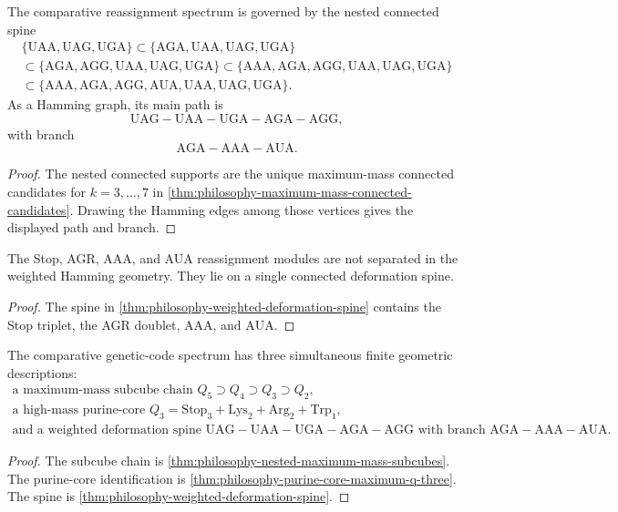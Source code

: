 \begin{theorem}
\label{thm:philosophy-weighted-deformation-spine}
The comparative reassignment spectrum is governed by the nested
connected spine
$$
\begin{gathered}
  \{\mathrm{UAA},\mathrm{UAG},\mathrm{UGA}\}
  \subset
  \{\mathrm{AGA},\mathrm{UAA},\mathrm{UAG},\mathrm{UGA}\}\\
  \subset
  \{\mathrm{AGA},\mathrm{AGG},\mathrm{UAA},\mathrm{UAG},\mathrm{UGA}\}
  \subset
  \{\mathrm{AAA},\mathrm{AGA},\mathrm{AGG},
    \mathrm{UAA},\mathrm{UAG},\mathrm{UGA}\}\\
  \subset
  \{\mathrm{AAA},\mathrm{AGA},\mathrm{AGG},\mathrm{AUA},
    \mathrm{UAA},\mathrm{UAG},\mathrm{UGA}\}.
\end{gathered}
$$
As a Hamming graph, its main path is
$$
  \mathrm{UAG}-\mathrm{UAA}-\mathrm{UGA}-\mathrm{AGA}-\mathrm{AGG},
$$
with branch
$$
  \mathrm{AGA}-\mathrm{AAA}-\mathrm{AUA}.
$$
\end{theorem}
\begin{proof}
The nested connected supports are the unique maximum-mass connected
candidates for $k=3,\ldots,7$ in
\autoref{thm:philosophy-maximum-mass-connected-candidates}. Drawing the
Hamming edges among those vertices gives the displayed path and branch.
\end{proof}

\begin{corollary}
\label{cor:philosophy-stop-agr-aaa-aua-one-spine}
The Stop, AGR, AAA, and AUA reassignment modules are not separated in
the weighted Hamming geometry. They lie on a single connected
deformation spine.
\end{corollary}
\begin{proof}
The spine in \autoref{thm:philosophy-weighted-deformation-spine}
contains the Stop triplet, the AGR doublet, $\mathrm{AAA}$, and
$\mathrm{AUA}$.
\end{proof}

\begin{theorem}
\label{thm:philosophy-weighted-spine-comparative-dynamics-statement}
The comparative genetic-code spectrum has three simultaneous finite
geometric descriptions:
$$
\begin{gathered}
  \text{a maximum-mass subcube chain }Q_{5}\supset Q_{4}\supset Q_{3}\supset Q_{2},\\
  \text{a high-mass purine-core }Q_{3}
  =\mathrm{Stop}_{3}+\mathrm{Lys}_{2}+\mathrm{Arg}_{2}+\mathrm{Trp}_{1},\\
  \text{and a weighted deformation spine }
  \mathrm{UAG}-\mathrm{UAA}-\mathrm{UGA}-\mathrm{AGA}-\mathrm{AGG}
  \text{ with branch }
  \mathrm{AGA}-\mathrm{AAA}-\mathrm{AUA}.
\end{gathered}
$$
\end{theorem}
\begin{proof}
The subcube chain is
\autoref{thm:philosophy-nested-maximum-mass-subcubes}. The purine-core
identification is \autoref{thm:philosophy-purine-core-maximum-q-three}.
The spine is \autoref{thm:philosophy-weighted-deformation-spine}.
\end{proof}

